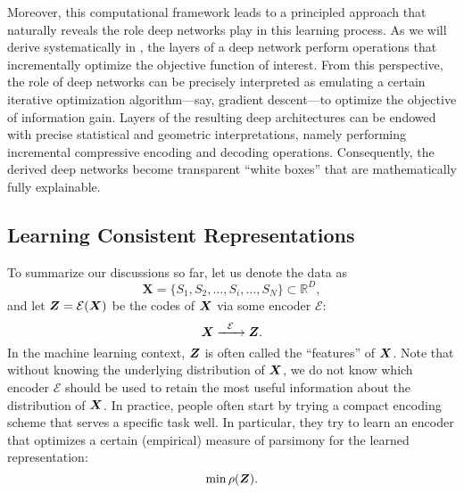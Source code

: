 \documentclass[../../book-main.tex]{subfiles}
\begin{document}
Moreover, this computational framework leads to a principled approach that naturally reveals the role deep networks play in this learning process. As we will derive systematically in , the layers of a deep network perform operations that incrementally optimize the objective function of interest. From this perspective, the role of deep networks can be precisely interpreted as emulating a certain iterative optimization algorithm---say, gradient descent---to optimize the objective of information gain. Layers of the resulting deep architectures can be endowed with precise statistical and geometric interpretations, namely performing incremental compressive encoding and decoding operations. Consequently, the derived deep networks become transparent ``white boxes'' that are mathematically fully explainable.



\subsection{Learning Consistent Representations}

\label{sec:consistency}

To summarize our discussions so far, let us denote the data as
\begin{equation}
    \boldsymbol{X} = \{S_1, S_2, \ldots, S_i, \ldots, S_N\} \subset \mathbb{R}^D,
\end{equation}
and let $\boldsymbol{Z} = \mathcal{E}(\bm{X})$ be the codes of $\bm{X}$ via some encoder $\mathcal{E}$:
\begin{equation}
    \bm{X}  \xrightarrow{\hspace{2mm} \mathcal{E}\hspace{2mm}} \bm{Z}.
    \label{eqn:open-loop}
\end{equation}
In the machine learning context, $\bm{Z}$ is often called the ``features'' of $\bm{X}$. Note that without knowing the underlying distribution of $\bm{X}$, we do not know which encoder $\mathcal{E}$ should be used to retain the most useful information about the distribution of $\bm{X}$. In practice, people often start by trying a compact encoding scheme that serves a specific task well. In particular, they try to learn an encoder that optimizes a certain (empirical) measure of parsimony for the learned representation:
\begin{equation}
    \min \rho(\bm{Z}). 
\end{equation}
\end{document}
